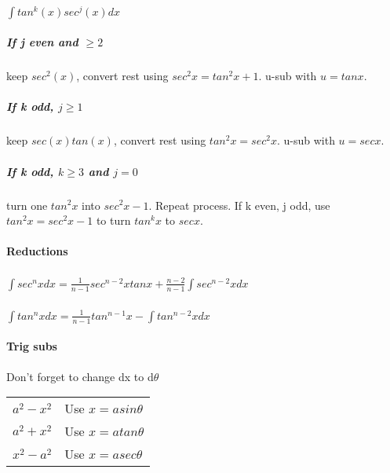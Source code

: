 \documentclass[10pt,landscape]{article}
\begin{document}
\begin{multicols}{4}
\paragraph{$ \int tan^k(x)sec^j(x)dx $}
\subparagraph{If j even and $\ge 2$}
keep $sec^2(x)$, convert rest using $sec^2x=tan^2x+1$. u-sub with $u=tanx$.
\subparagraph{If k odd, $j \ge 1$}
keep $sec(x)tan(x)$, convert rest using $tan^2x=sec^2x$. u-sub with $u=secx$.
\subparagraph{If k odd, $k \ge 3$ and $j=0$}
turn one $tan^2x$ into $sec^2x-1$. Repeat process.
If k even, j odd, use $tan^2x=sec^2x-1$ to turn $tan^kx$ to $secx$.

\paragraph{Reductions}
\subparagraph{}
$ \int sec^nx dx = \frac{1}{n-1}sec^{n-2}xtanx+\frac{n-2}{n-1}\int sec^{n-2}x dx$
\subparagraph{}
$ \int tan^nx dx = \frac{1}{n-1}tan^{n-1}x-\int tan^{n-2}x dx$

\paragraph{Trig subs}
Don't forget to change dx to d$\theta$

\begin{tabular}{l l}
$a^2-x^2$ & Use $x=asin\theta$ \\
$a^2+x^2$ & Use $x=atan\theta$ \\
$x^2-a^2$ & Use $x=asec\theta$
\end{tabular}
		
	\end{multicols}
\end{document}
